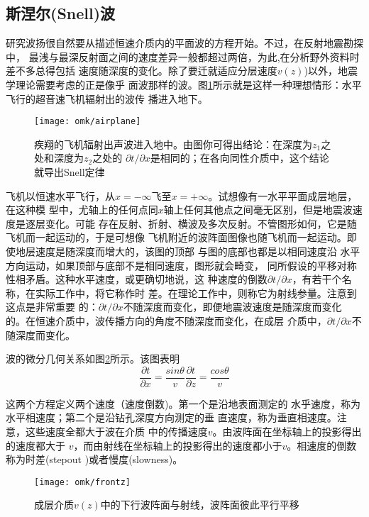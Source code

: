 \subsection{斯涅尔(Snell)波}
研究波扬很自然要从描述恒速介质内的平面波的方程开始。不过，在反射地震勘探中，
最浅与最深反射面之间的速度差异一般都超过两倍，为此,在分析野外资料时差不多总得包括
速度随深度的变化。除了要迁就适应分层速度$v(z)$)以外，地震学理论需要考虑的正是像乎
面波那样的波。图\ref{fig:omk/airplane}所示就是这样一种理想情形：水平飞行的超音速飞机辐射出的波传
播进入地下。
\begin{figure}[H]
\centering
\texttt{[image: omk/airplane]}
\caption[airplane]{疾翔的飞机辐射出声波进入地中。由图你可得出结论：在深度为$z_1$之处和深度为$z_2$之处的
$\partial t/\partial x$是相同的；在各向同性介质中，这个结论就导出Snell定律}
\label{fig:omk/airplane}
\end{figure}
飞机以恒速水平飞行，从$x=-\infty$飞至$x=+\infty$。试想像有一水平平面成层地层，在这种模
型中，尤轴上的任何点同$x$轴上任何其他点之间毫无区别，但是地震波速度是逐层变化。可能
存在反射、折射、横波及多次反射。不管图形如何，它是随飞机而一起运动的，于是可想像
飞机附近的波阵面图像也随飞机而一起运动。即使地层速度是随深度而增大的，该图的顶部
与图的底部也都是以相同速度沿
水平方向运动，如果顶部与底部不是相同速度，图形就会畸变，
同所假设的平移对称性相矛盾。这种水平速度，或更确切地说，这
种速度的倒数$\partial t/\partial x$，有若干个名称，在实际工作中，将它称作时
差。在理论工作中，则称它为射线参量。注意到这点是非常重要
的：$\partial t/\partial x$不随深度而变化，即便地震波速度是随深度而变化
的。在恒速介质中，波传播方向的角度不随深度而变化，在成层
介质中，$\partial t/\partial x$不随深度而变化。

波的微分几何关系如图\ref{fig:omk/frontz}所示。该图表明
\begin{subequations}\label{eq:ex1.5.4}
\begin{equation}
\frac{\partial t}{\partial x}=\frac{sin\theta}{v}
\label{eq:ex1.5.4a}
\end{equation}
\begin{equation}
\frac{\partial t}{\partial z}=\frac{cos\theta}{v}
\label{eq:ex1.5.4b}
\end{equation}
\end{subequations}

这两个方程定义两个速度（速度倒数)。第一个是沿地表面测定的
水乎速度，称为水平相速度；第二个是沿钻孔深度方向测定的垂
直速度，称为垂直相速度。注意，这些速度全都大于波在介质
中的传播速度$v$。由波阵面在坐标轴上的投影得出的速度都大于
$v$，而由射线在坐标轴上的投影得出的速度都小于$v$。相速度的倒数称为时差(stepout
)或者慢度(slowness)。
\begin{figure}[H]
\centering
\texttt{[image: omk/frontz]}
\caption[frontz]{成层介质$v(z)$中的下行波阵面与射线，波阵面彼此平行平移}
\label{fig:omk/frontz}
\end{figure}

